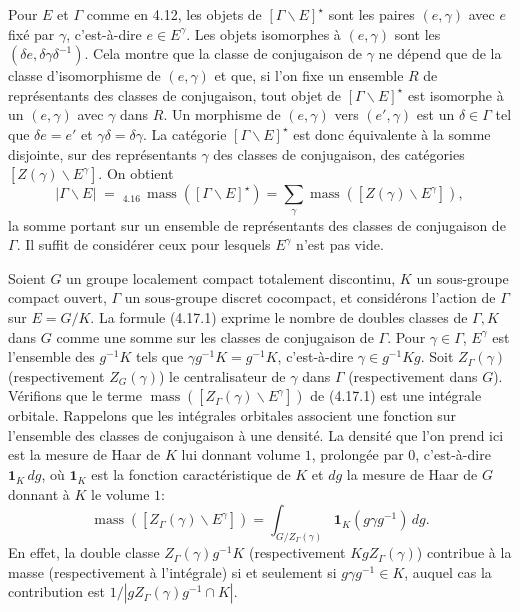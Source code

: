\documentclass[10pt]{article}
\newcommand{\mass}{\operatorname{mass}}
\theoremstyle{deligne}
\newcommand{\heading}[1]{\vspace{0.7em}\noindent{\bfseries #1}\quad}
\begin{document}
\heading{Exemple 4.17.} Pour $E$ et $\Gamma$ comme en 4.12, les objets de $[\Gamma\backslash E]^\star$ sont les paires $(e,\gamma)$ avec $e$ fixé par $\gamma$, c'est-à-dire $e\in E^\gamma$. Les objets isomorphes à $(e,\gamma)$ sont les $(\delta e,\delta\gamma\delta^{-1})$. Cela montre que la classe de conjugaison de $\gamma$ ne dépend que de la classe d'isomorphisme de $(e,\gamma)$ et que, si l'on fixe un ensemble $R$ de représentants des classes de conjugaison, tout objet de $[\Gamma\backslash E]^\star$ est isomorphe à un $(e,\gamma)$ avec $\gamma$ dans $R$. Un morphisme de $(e,\gamma)$ vers $(e',\gamma)$ est un $\delta\in\Gamma$ tel que $\delta e=e'$ et $\gamma\delta=\delta\gamma$. La catégorie $[\Gamma\backslash E]^\star$ est donc équivalente à la somme disjointe, sur des représentants $\gamma$ des classes de conjugaison, des catégories $[Z(\gamma)\backslash E^\gamma]$. On obtient
\begin{equation}\tag{4.17.1}
|\Gamma\backslash E|\;=\;{}_{4.16}\,\mass([\Gamma\backslash E]^\star)
=\sum_\gamma \mass([Z(\gamma)\backslash E^\gamma]),
\end{equation}
la somme portant sur un ensemble de représentants des classes de conjugaison de $\Gamma$. Il suffit de considérer ceux pour lesquels $E^\gamma$ n'est pas vide.

\heading{Exemple 4.18.} Soient $G$ un groupe localement compact totalement discontinu, $K$ un sous-groupe compact ouvert, $\Gamma$ un sous-groupe discret cocompact, et considérons l'action de $\Gamma$ sur $E=G/K$. La formule (4.17.1) exprime le nombre de doubles classes de $\Gamma,K$ dans $G$ comme une somme sur les classes de conjugaison de $\Gamma$. Pour $\gamma\in\Gamma$, $E^\gamma$ est l'ensemble des $g^{-1}K$ tels que $\gamma g^{-1}K=g^{-1}K$, c'est-à-dire $\gamma\in g^{-1}Kg$. Soit $Z_\Gamma(\gamma)$ (respectivement $Z_G(\gamma)$) le centralisateur de $\gamma$ dans $\Gamma$ (respectivement dans $G$). Vérifions que le terme $\mass([Z_\Gamma(\gamma)\backslash E^\gamma])$ de (4.17.1) est une intégrale orbitale. Rappelons que les intégrales orbitales associent une fonction sur l'ensemble des classes de conjugaison à une densité. La densité que l'on prend ici est la mesure de Haar de $K$ lui donnant volume $1$, prolongée par $0$, c'est-à-dire $\mathbf 1_K\,dg$, où $\mathbf 1_K$ est la fonction caractéristique de $K$ et $dg$ la mesure de Haar de $G$ donnant à $K$ le volume $1$:
\begin{equation}\tag{4.18.1}
\mass([Z_\Gamma(\gamma)\backslash E^\gamma])=
\int_{G/Z_\Gamma(\gamma)}\mathbf 1_K(g\gamma g^{-1})\,dg.
\end{equation}
En effet, la double classe $Z_\Gamma(\gamma)g^{-1}K$ (respectivement $KgZ_\Gamma(\gamma)$) contribue à la masse (respectivement à l'intégrale) si et seulement si $g\gamma g^{-1}\in K$, auquel cas la contribution est $1/|gZ_\Gamma(\gamma)g^{-1}\cap K|$.
\end{document}
